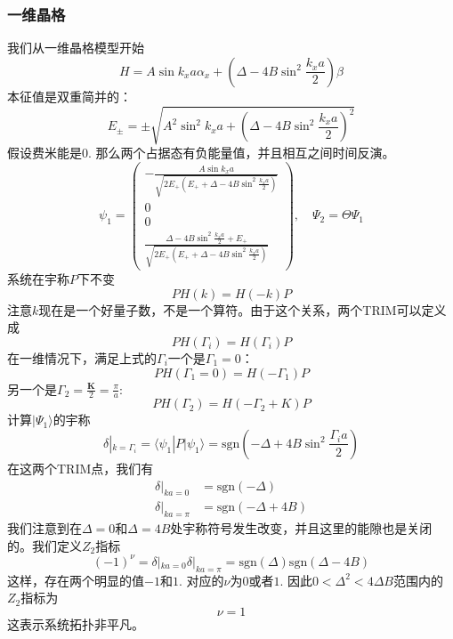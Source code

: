 \documentclass{article}
\numberwithin{equation}{subsection}
\begin{document}
\subsubsection{一维晶格}
我们从一维晶格模型开始
\begin{equation}
    H=A\sin k_xa\alpha_x+\left(\Delta-4B\sin^2\frac{k_xa}{2}\right)\beta
\end{equation}
本征值是双重简并的：
\begin{equation}
    E_{\pm}=\pm\sqrt{A^2\sin^2k_xa+\left(\Delta-4B\sin^2\frac{k_xa}{2}\right)^2}
\end{equation}
假设费米能是$0$. 那么两个占据态有负能量值，并且相互之间时间反演。
\begin{equation}
    \psi_{1}=\left(\begin{array}{c}
        -\frac{A \sin k_{x} a}{\sqrt{2 E_{+}\left(E_{+}+\Delta-4 B \sin ^{2} \frac{k_{x} a}{2}\right)}} \\
        0 \\
        0 \\
        \frac{\Delta-4 B \sin ^{2} \frac{k_{x} a}{2}+E_{+}}{\sqrt{2 E_{+}\left(E_{+}+\Delta-4 B \sin ^{2} \frac{k_{x} a}{2}\right)}}
        \end{array}\right),\quad\Psi_2=\Theta\Psi_1
\end{equation}
系统在宇称$P$下不变
\begin{equation}
    PH(k)=H(-k)P
\end{equation}
注意$k$现在是一个好量子数，不是一个算符。由于这个关系，两个TRIM可以定义成
\begin{equation}
    PH(\Gamma_i)=H(\Gamma_i)P
\end{equation}
在一维情况下，满足上式的$\Gamma_i$一个是$\Gamma_1=0$：
\begin{equation}
    PH(\Gamma_1=0)=H(-\Gamma_1)P
\end{equation}
另一个是$\Gamma_2=\frac{\mathbf{K}}{2}=\frac{\pi}{a}$:
\begin{equation}
    PH(\Gamma_2)=H(-\Gamma_2+K)P
\end{equation}
计算$|\Psi_1\rangle$的宇称
\begin{equation}
    \delta|_{k=\Gamma_i}=\langle\psi_1|P|\psi_1\rangle=\mathrm{sgn}(-\Delta+4B\sin^2\frac{\Gamma_ia}{2})
\end{equation}
在这两个TRIM点，我们有
\begin{equation}
    \begin{split}
        \delta|_{ka=0}&=\mathrm{sgn}(-\Delta)\\
        \delta|_{ka=\pi}&=\mathrm{sgn}(-\Delta+4B)
    \end{split}
\end{equation}
我们注意到在$\Delta=0$和$\Delta=4B$处宇称符号发生改变，并且这里的能隙也是关闭的。我们定义$Z_2$指标
\begin{equation}
    (-1)^\nu=\delta|_{ka=0}\delta|_{ka=\pi}=\mathrm{sgn}(\Delta)\mathrm{sgn}(\Delta-4B)
\end{equation}
这样，存在两个明显的值$-1$和$1$. 对应的$\nu$为$0$或者$1$. 因此$0<\Delta^2<4\Delta B$范围内的$Z_2$指标为
\begin{equation}
    \nu=1
\end{equation}
这表示系统拓扑非平凡。
\end{document}

